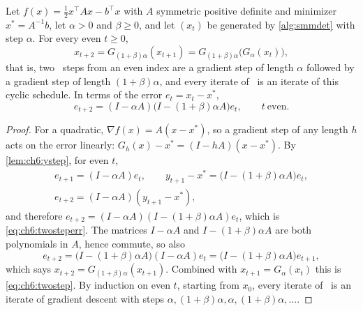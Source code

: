 \begin{theorem}\label{thm:smmquad}
Let $f(x)=\tfrac12x^\top Ax-b^\top x$ with $A$ symmetric positive definite and
minimizer $x^\ast=A^{-1}b$, let $\alpha>0$ and $\beta\ge0$, and let $(x_t)$ be
generated by \cref{alg:smmdet} with step $\alpha$. For every even $t\ge0$,
\begin{equation}\label{eq:ch6:twostep}
  x_{t+2} = G_{(1+\beta)\alpha}(x_{t+1}) = G_{(1+\beta)\alpha}\bigl(G_\alpha(x_t)\bigr),
\end{equation}
that is, two \smmdet\ steps from an even index are a gradient step of length
$\alpha$ followed by a gradient step of length $(1+\beta)\alpha$, and every
iterate of \smmdet\ is an iterate of this cyclic schedule. In terms of the
error $e_t=x_t-x^\ast$,
\begin{equation}\label{eq:ch6:twosteperr}
  e_{t+2} = (I-\alpha A)\bigl(I-(1+\beta)\alpha A\bigr)e_t,\qquad t\ \text{even}.
\end{equation}
\end{theorem}

\begin{proof}
For a quadratic, $\nabla f(x)=A(x-x^\ast)$, so a gradient step of any length $h$
acts on the error linearly: $G_h(x)-x^\ast=(I-hA)(x-x^\ast)$. By
\cref{lem:ch6:ystep}, for even $t$,
\begin{gather*}
  e_{t+1}=(I-\alpha A)e_t,\qquad
  y_{t+1}-x^\ast=\bigl(I-(1+\beta)\alpha A\bigr)e_t,\\
  e_{t+2}=(I-\alpha A)(y_{t+1}-x^\ast),
\end{gather*}
and therefore $e_{t+2}=(I-\alpha A)(I-(1+\beta)\alpha A)e_t$, which is
\eqref{eq:ch6:twosteperr}. The matrices $I-\alpha A$ and $I-(1+\beta)\alpha A$
are both polynomials in $A$, hence commute, so also
\[
  e_{t+2}=\bigl(I-(1+\beta)\alpha A\bigr)(I-\alpha A)e_t
  =\bigl(I-(1+\beta)\alpha A\bigr)e_{t+1},
\]
which says $x_{t+2}=G_{(1+\beta)\alpha}(x_{t+1})$. Combined with
$x_{t+1}=G_\alpha(x_t)$ this is \eqref{eq:ch6:twostep}. By induction on even
$t$, starting from $x_0$, every iterate of \smmdet\ is an iterate of gradient
descent with steps $\alpha,(1+\beta)\alpha,\alpha,(1+\beta)\alpha,\dots$.
\end{proof}


